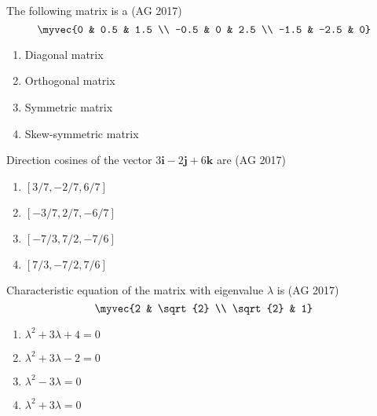 \item The following matrix is a
\hfill(AG 2017)
\[
\myvec{0 & 0.5 & 1.5 \\
-0.5 & 0 & 2.5 \\
-1.5 & -2.5 & 0}
\]
\begin{multicols}{2}
\begin{enumerate}
\item Diagonal matrix
\item Orthogonal matrix
\item Symmetric matrix
\item Skew-symmetric matrix
\end{enumerate}
\end{multicols}
\item Direction cosines of the vector $3\mathbf{i} - 2\mathbf{j} + 6\mathbf{k}$ are
\hfill(AG 2017)
\begin{multicols}{2}
\begin{enumerate}
\item $[3/7, -2/7, 6/7]$
\item $[-3/7, 2/7, -6/7]$
\item $[-7/3, 7/2, -7/6]$
\item $[7/3, -7/2, 7/6]$
\end{enumerate}
\end{multicols}
\item Characteristic equation of the matrix with eigenvalue $\lambda$ is
\hfill(AG 2017)
\[
\myvec{2 & \sqrt{2} \\
\sqrt{2} & 1}
\]
\begin{multicols}{4}
\begin{enumerate}
\item $\lambda^2 + 3\lambda + 4 = 0$
\item $\lambda^2 + 3\lambda - 2 = 0$
\item $\lambda^2 - 3\lambda = 0$
\item $\lambda^2 + 3\lambda = 0$
\end{enumerate}
\end{multicols}
